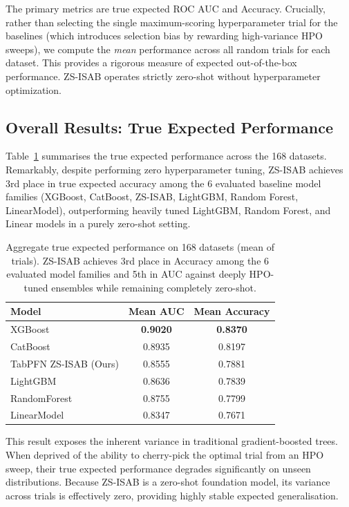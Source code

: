 \documentclass{article}
\begin{document}
The primary metrics are true expected ROC AUC and Accuracy. Crucially, rather than selecting the single maximum-scoring hyperparameter trial for the baselines (which introduces selection bias by rewarding high-variance HPO sweeps), we compute the \emph{mean} performance across all random trials for each dataset. This provides a rigorous measure of expected out-of-the-box performance. ZS-ISAB operates strictly zero-shot without hyperparameter optimization.

\subsection{Overall Results: True Expected Performance}

Table~\ref{tab:aggregate} summarises the true expected performance across the 168 datasets. Remarkably, despite performing zero hyperparameter tuning, ZS-ISAB achieves 3rd place in true expected accuracy among the 6 evaluated baseline model families (XGBoost, CatBoost, ZS-ISAB, LightGBM, Random Forest, LinearModel), outperforming heavily tuned LightGBM, Random Forest, and Linear models in a purely zero-shot setting.

\begin{table}[htbp]
\centering
\caption{Aggregate true expected performance on 168 datasets (mean of trials). ZS-ISAB achieves 3rd place in Accuracy among the 6 evaluated model families and 5th in AUC against deeply HPO-tuned ensembles while remaining completely zero-shot.}
\label{tab:aggregate}
\small
\begin{tabular}{@{}lcc@{}}
\toprule
\textbf{Model} & \textbf{Mean AUC} & \textbf{Mean Accuracy} \\
\midrule
XGBoost & \textbf{0.9020} & \textbf{0.8370} \\
CatBoost & 0.8935 & 0.8197 \\
TabPFN ZS-ISAB (Ours) & 0.8555 & 0.7881 \\
LightGBM & 0.8636 & 0.7839 \\
RandomForest & 0.8755 & 0.7799 \\
LinearModel & 0.8347 & 0.7671 \\
\bottomrule
\end{tabular}
\end{table}

This result exposes the inherent variance in traditional gradient-boosted trees. When deprived of the ability to cherry-pick the optimal trial from an HPO sweep, their true expected performance degrades significantly on unseen distributions. Because ZS-ISAB is a zero-shot foundation model, its variance across trials is effectively zero, providing highly stable expected generalisation.
\end{document}
